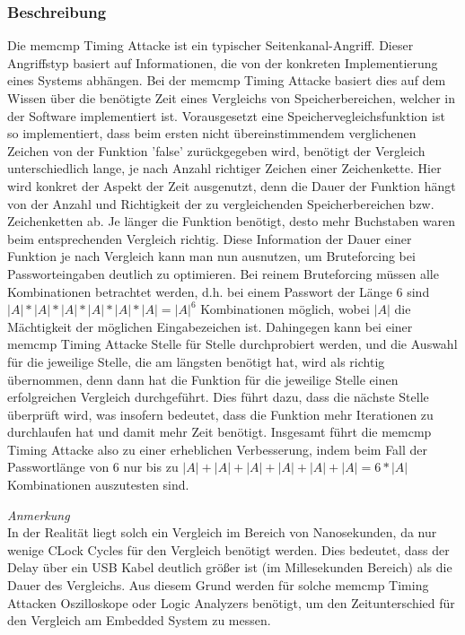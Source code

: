 \documentclass[a4paper,
DIV=13,
12pt,
BCOR=10mm,
department=FakIM,
oneside,
parskip=half,
automark,
listof=totocnumbered,
bibliography=totocnumbered,
acronym=totocnumbered
] {OTHRartcl}
\begin{document}
\subsubsection{Beschreibung}
Die memcmp Timing Attacke ist ein typischer Seitenkanal-Angriff. Dieser Angriffstyp basiert auf Informationen, die von der konkreten Implementierung eines Systems abhängen.
Bei der memcmp Timing Attacke basiert dies auf dem Wissen über die benötigte Zeit eines Vergleichs von Speicherbereichen, welcher in der Software implementiert ist. \cite{Hardware Hacking Handbook}
Vorausgesetzt eine Speichervegleichsfunktion ist so implementiert, dass beim ersten nicht übereinstimmendem verglichenen Zeichen von der Funktion 'false' zurückgegeben wird,
benötigt der Vergleich unterschiedlich lange, je nach Anzahl richtiger Zeichen einer Zeichenkette.
Hier wird konkret der Aspekt der Zeit ausgenutzt, denn die Dauer der Funktion hängt von der Anzahl und Richtigkeit der zu vergleichenden Speicherbereichen bzw. Zeichenketten ab.
Je länger die Funktion benötigt, desto mehr Buchstaben waren beim entsprechenden Vergleich richtig.
Diese Information der Dauer einer Funktion je nach Vergleich kann man nun ausnutzen, um Bruteforcing bei Passworteingaben deutlich zu optimieren.
Bei reinem Bruteforcing müssen alle Kombinationen betrachtet werden, d.h.
bei einem Passwort der Länge 6 sind $|A|*|A|*|A|*|A|*|A|*|A| = |A|^6$ Kombinationen möglich, wobei $|A|$ die Mächtigkeit der möglichen Eingabezeichen ist.
Dahingegen kann bei einer memcmp Timing Attacke Stelle für Stelle durchprobiert werden, und die Auswahl für die jeweilige Stelle, die am längsten benötigt hat,
wird als richtig übernommen, denn dann hat die Funktion für die jeweilige Stelle einen erfolgreichen Vergleich durchgeführt.
Dies führt dazu, dass die nächste Stelle überprüft wird, was insofern bedeutet, dass die Funktion mehr Iterationen zu durchlaufen hat und damit mehr Zeit benötigt.
Insgesamt führt die memcmp Timing Attacke also zu einer erheblichen Verbesserung, indem beim Fall der Passwortlänge von 6
nur bis zu $ |A|+|A|+|A|+|A|+|A|+|A| = 6 * |A| $ Kombinationen auszutesten sind.

\textit{Anmerkung} \mbox{} \\
In der Realität liegt solch ein Vergleich im Bereich von Nanosekunden, da nur wenige CLock Cycles für den Vergleich benötigt werden.
Dies bedeutet, dass der Delay über ein USB Kabel deutlich größer ist (im Millesekunden Bereich) als die Dauer des Vergleichs.
Aus diesem Grund werden für solche memcmp Timing Attacken Oszilloskope oder Logic Analyzers benötigt, um den Zeitunterschied
für den Vergleich am Embedded System zu messen.
\end{document}
